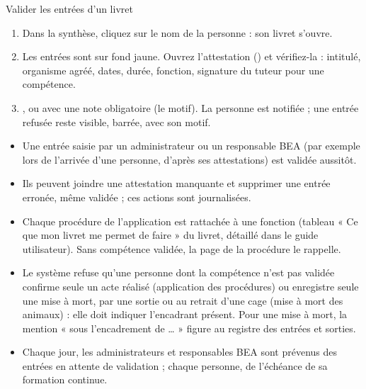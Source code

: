 \documentclass[11pt,a4paper]{article}
\begin{document}
\begin{procedure}{Valider les entrées d'un livret}
\begin{enumerate}
  \item Dans la synthèse, cliquez sur le nom de la personne : son livret
    s'ouvre.
  \item Les entrées  sont sur fond jaune. Ouvrez
    l'attestation () et vérifiez-la : intitulé, organisme agréé,
    dates, durée, fonction, signature du tuteur pour une compétence.
  \item {}, ou  avec une note obligatoire (le
    motif). La personne est notifiée ; une entrée refusée reste visible,
    barrée, avec son motif.
\end{enumerate}
\end{procedure}

\begin{regle}
\begin{itemize}
  \item Une entrée saisie par un administrateur ou un responsable BEA (par
    exemple lors de l'arrivée d'une personne, d'après ses attestations) est
    validée aussitôt.
  \item Ils peuvent joindre une attestation manquante et supprimer une
    entrée erronée, même validée ; ces actions sont journalisées.
  \item Chaque procédure de l'application est rattachée à une fonction
    (tableau « Ce que mon livret me permet de faire » du livret, détaillé dans
    le guide utilisateur). Sans compétence validée, la page de la procédure
    le rappelle.
  \item Le système refuse qu'une personne dont la compétence n'est pas
    validée confirme seule un acte réalisé (application des procédures) ou
    enregistre seule une mise à mort, par une sortie ou au retrait d'une cage
    (mise à mort des animaux) : elle doit indiquer l'encadrant présent. Pour
    une mise à mort, la mention « sous l'encadrement de … » figure au
    registre des entrées et sorties.
  \item Chaque jour, les administrateurs et responsables BEA sont prévenus
    des entrées en attente de validation ; chaque personne, de l'échéance de
    sa formation continue.
\end{itemize}
\end{regle}
\end{document}
